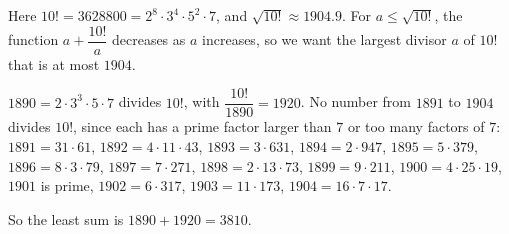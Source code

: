 Here $10!=3628800=2^8\cdot3^4\cdot5^2\cdot7$, and $\sqrt{10!}\approx1904.9$. For $a\le\sqrt{10!}$, the function $a+\dfrac{10!}{a}$ decreases as $a$ increases, so we want the largest divisor $a$ of $10!$ that is at most $1904$.

$1890=2\cdot3^3\cdot5\cdot7$ divides $10!$, with $\dfrac{10!}{1890}=1920$. No number from $1891$ to $1904$ divides $10!$, since each has a prime factor larger than $7$ or too many factors of $7$: $1891=31\cdot61$, $1892=4\cdot11\cdot43$, $1893=3\cdot631$, $1894=2\cdot947$, $1895=5\cdot379$, $1896=8\cdot3\cdot79$, $1897=7\cdot271$, $1898=2\cdot13\cdot73$, $1899=9\cdot211$, $1900=4\cdot25\cdot19$, $1901$ is prime, $1902=6\cdot317$, $1903=11\cdot173$, $1904=16\cdot7\cdot17$.

So the least sum is $1890+1920=\boxed{3810}$.
